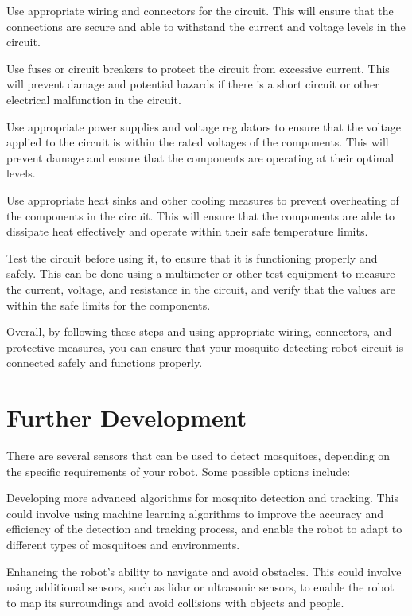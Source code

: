 \documentclass[11pt]{article}
\begin{document}
	Use appropriate wiring and connectors for the circuit. This will ensure that the connections are secure and able to withstand the current and voltage levels in the circuit.
	
	Use fuses or circuit breakers to protect the circuit from excessive current. This will prevent damage and potential hazards if there is a short circuit or other electrical malfunction in the circuit.
	
	Use appropriate power supplies and voltage regulators to ensure that the voltage applied to the circuit is within the rated voltages of the components. This will prevent damage and ensure that the components are operating at their optimal levels.
	
	Use appropriate heat sinks and other cooling measures to prevent overheating of the components in the circuit. This will ensure that the components are able to dissipate heat effectively and operate within their safe temperature limits.
	
	Test the circuit before using it, to ensure that it is functioning properly and safely. This can be done using a multimeter or other test equipment to measure the current, voltage, and resistance in the circuit, and verify that the values are within the safe limits for the components.
	
	Overall, by following these steps and using appropriate wiring, connectors, and protective measures, you can ensure that your mosquito-detecting robot circuit is connected safely and functions properly.
	
	
	
	
	


	
	
	\section{Further Development}
	
	
	There are several sensors that can be used to detect mosquitoes, depending on the specific requirements of your robot. Some possible options include:
	
   Developing more advanced algorithms for mosquito detection and tracking. This could involve using machine learning algorithms to improve the accuracy and efficiency of the detection and tracking process, and enable the robot to adapt to different types of mosquitoes and environments.
	
	Enhancing the robot's ability to navigate and avoid obstacles. This could involve using additional sensors, such as lidar or ultrasonic sensors, to enable the robot to map its surroundings and avoid collisions with objects and people.
	
\end{document}
